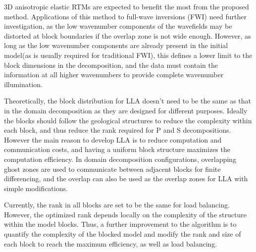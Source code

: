 \documentclass[manuscript,ulem,graphix,revised]{geophysics}
\begin{document}
3D anisotropic elastic RTMs are expected to benefit the most from the proposed method. Applications of this method to full-wave inversions (FWI) need further investigation, as the low wavenumber components of the wavefields may be distorted at block boundaries if the overlap zone is not wide enough. However, as long as the low wavenumber components are already present in the initial model(as is usually required for traditional FWI), this defines a lower limit to the block dimensions in the decomposition, and the data must contain the information at all higher wavenumbers to provide complete wavenumber illumination.

Theoretically, the block distribution for LLA doesn't need to be the same as that in the domain decomposition as they are designed for different purposes. Ideally the blocks should follow the geological structures to reduce the complexity within each block, and thus reduce the rank required for P and S decompositions. However the main reason to develop LLA is to reduce computation and communication costs, and having a uniform block structure maximizes the computation efficiency. In domain decomposition configurations, overlapping ghost zones are used to communicate between adjacent blocks for finite differencing, and the overlap can also be used as the overlap zones for LLA with simple modifications. 

Currently, the rank in all blocks are set to be the same for load balancing. However, the optimized rank depends locally on the complexity of the structure within the model blocks. Thus, a further improvement to the algorithm is to quantify the complexity of the blocked model and modify the rank and size of each block to reach the maximum efficiency, as well as load balancing.


\end{document}
